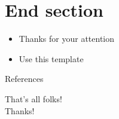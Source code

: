 \documentclass{beamer}
\begin{document}
\section{End section}
\begin{frame}
    \begin{itemize}
        \item Thanks for your attention
        \item Use this template
    \end{itemize}
\end{frame}


%     

\begin{frame}{References}
	\printbibliography[heading=reference]
\end{frame}

\begin{frame}
    \begin{center}
        {\Huge\calligra That's all folks!\\Thanks!}
    \end{center}
\end{frame}
\end{document}

